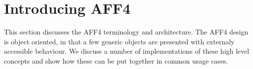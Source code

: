 \documentclass[10pt, conference]{IEEEtran}
\begin{document}




\section{Introducing AFF4}

This section discusses the AFF4 terminology and architecture. The AFF4
design is object oriented, in that a few generic objects are presented
with externaly accessible behaviour. We discuss a number of
implementations of these high level concepts and show how these can be
put together in common usage cases.
\end{document}

